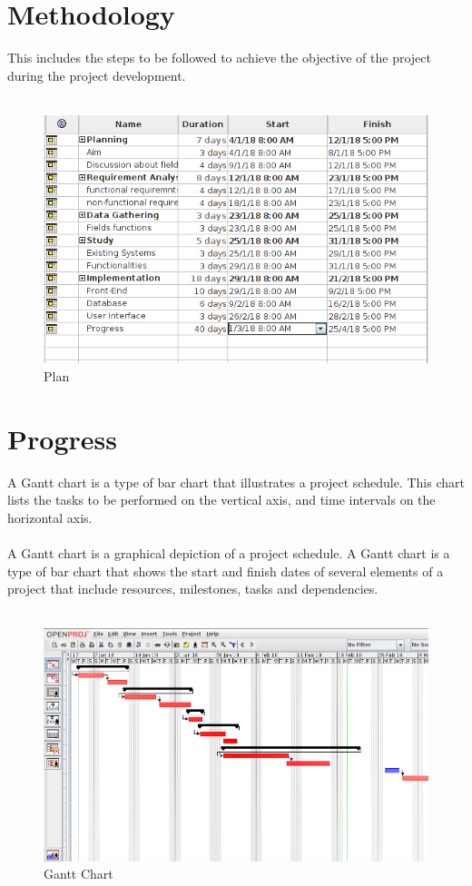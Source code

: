 
\section{ Methodology}

This includes the steps to be followed to achieve the objective of the project during the project
development.\\\\

 
 \begin{figure}[h!]
	\centering \includegraphics[scale=.74]{input/images/chart2.png}
	\caption{Plan}
\end{figure}
\newpage
\section{Progress}

A Gantt chart is a type of bar chart that illustrates a project schedule. This chart lists the tasks to be performed on the vertical axis, and time intervals on the horizontal axis.\\\\
A Gantt chart is a graphical depiction of a project schedule. A Gantt chart is a type of bar chart that shows the start and finish dates of several elements of a project that include resources, milestones, tasks and dependencies. \\\\


 \begin{figure}[h!]
	\centering \includegraphics[scale=.43]{input/images/chart1.png}
	\caption{Gantt Chart}
\end{figure}



